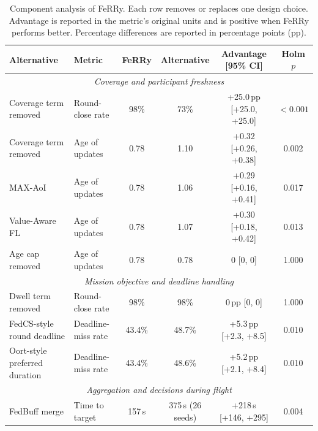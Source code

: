 \documentclass[conference]{IEEEtran}
\newcommand{\sysname}{FeRRy}
\begin{document}
\begin{table}[t]
\centering
\caption{Component analysis of \sysname{}. Each row removes or replaces one
design choice. Advantage is reported in the metric's original units and is
positive when \sysname{} performs better. Percentage differences are reported
in percentage points (pp).}
\label{tab:component-analysis}
\small
\begin{tabular}{
p{}
p{}
c
c
c
c
}
\hline
\textbf{Alternative} &
\textbf{Metric} &
\textbf{\sysname{}} &
\textbf{Alternative} &
\textbf{Advantage [95\% CI]} &
\textbf{Holm $p$} \\
\hline

\multicolumn{6}{c}{\textit{Coverage and participant freshness}} \\
\hline
Coverage term removed &
Round-close rate &
98\% & 73\% &
+25.0\,pp [+25.0, +25.0] &
$<0.001$ \\

Coverage term removed &
Age of updates &
0.78 & 1.10 &
+0.32 [+0.26, +0.38] &
0.002 \\

MAX-AoI &
Age of updates &
0.78 & 1.06 &
+0.29 [+0.16, +0.41] &
0.017 \\

Value-Aware FL &
Age of updates &
0.78 & 1.07 &
+0.30 [+0.18, +0.42] &
0.013 \\

Age cap removed &
Age of updates &
0.78 & 0.78 &
0 [0, 0] &
1.000 \\

\hline
\multicolumn{6}{c}{\textit{Mission objective and deadline handling}} \\
\hline

Dwell term removed &
Round-close rate &
98\% & 98\% &
0\,pp [0, 0] &
1.000 \\

FedCS-style round deadline &
Deadline-miss rate &
43.4\% & 48.7\% &
+5.3\,pp [+2.3, +8.5] &
0.010 \\

Oort-style preferred duration &
Deadline-miss rate &
43.4\% & 48.6\% &
+5.2\,pp [+2.1, +8.4] &
0.010 \\

\hline
\multicolumn{6}{c}{\textit{Aggregation and decisions during flight}} \\
\hline

FedBuff merge &
Time to target &
157\,s & 375\,s (26 seeds) &
+218\,s [+146, +295] &
0.004 \\


\end{tabular}
\end{table}
\end{document}

